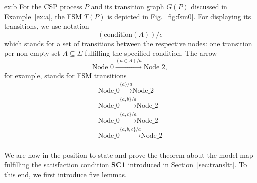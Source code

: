 \begin{example}{ex:b}
For the CSP process $P$ and its transition graph $G(P)$ discussed in
Example~\ref{ex:a}, the FSM $T(P)$ is depicted in Fig.~\ref{fig:fsm0}. For
displaying its transitions, we use notation
\[
(\text{condition}(A)) / e
\]
which stands for a set of transitions between the respective nodes: one transition per non-empty set $A\subseteq \Sigma$ fulfilling the specified condition.
The arrow
\[
\text{Node\_0} \xrightarrow{(a\in A) / a} \text{Node\_2},
\]
for example, stands for FSM transitions
\[
\begin{array}{l}
\text{Node\_0} \xrightarrow{\{a\}/a} \text{Node\_2} \\
\text{Node\_0} \xrightarrow{\{a,b\}/a} \text{Node\_2} \\
\text{Node\_0} \xrightarrow{\{a,c\}/a} \text{Node\_2} \\
\text{Node\_0} \xrightarrow{\{a,b,c\}/a} \text{Node\_2} \\
\end{array}
\]
\end{example}
%
\noindent%
We are now in the position to state and prove the theorem about the model map
fulfilling the satisfaction condition {\bf SC1} introduced in
Section~\ref{sec:transltt}. To this end, we first introduce five lemmas.

